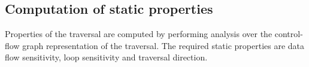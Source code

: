 \subsection{Computation of static properties}
\label{sec:static}


%
Properties of the traversal are computed by performing analysis over the control-flow graph representation of the traversal. The required static properties are data flow sensitivity, loop sensitivity and traversal direction.


